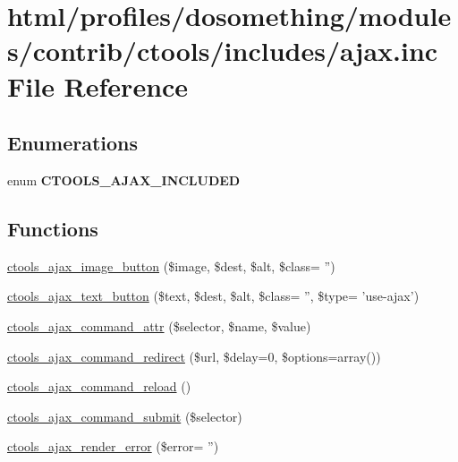 \hypertarget{profiles_2dosomething_2modules_2contrib_2ctools_2includes_2ajax_8inc}{
\section{html/profiles/dosomething/modules/contrib/ctools/includes/ajax.inc File Reference}
\label{profiles_2dosomething_2modules_2contrib_2ctools_2includes_2ajax_8inc}
}
\subsection*{Enumerations}
\begin{DoxyCompactItemize}
\item 
enum {\bfseries CTOOLS\_\-AJAX\_\-INCLUDED} 
\end{DoxyCompactItemize}
\subsection*{Functions}
\begin{DoxyCompactItemize}
\item 
\hyperlink{profiles_2dosomething_2modules_2contrib_2ctools_2includes_2ajax_8inc_a00499a965fd0a192af2106a400c0e140}{ctools\_\-ajax\_\-image\_\-button} (\$image, \$dest, \$alt, \$class= '')
\item 
\hyperlink{profiles_2dosomething_2modules_2contrib_2ctools_2includes_2ajax_8inc_aa20aff28acfb85cc21e49727d3126aad}{ctools\_\-ajax\_\-text\_\-button} (\$text, \$dest, \$alt, \$class= '', \$type= 'use-\/ajax')
\item 
\hyperlink{profiles_2dosomething_2modules_2contrib_2ctools_2includes_2ajax_8inc_a598e0895893a1295ec95964a2a7e97d8}{ctools\_\-ajax\_\-command\_\-attr} (\$selector, \$name, \$value)
\item 
\hyperlink{profiles_2dosomething_2modules_2contrib_2ctools_2includes_2ajax_8inc_a5f3e0560404a0fbd02f118c1f7408e24}{ctools\_\-ajax\_\-command\_\-redirect} (\$url, \$delay=0, \$options=array())
\item 
\hyperlink{profiles_2dosomething_2modules_2contrib_2ctools_2includes_2ajax_8inc_abadcd3021f5a0dedff23944d40dbc1ae}{ctools\_\-ajax\_\-command\_\-reload} ()
\item 
\hyperlink{profiles_2dosomething_2modules_2contrib_2ctools_2includes_2ajax_8inc_a911fe17d610b49cdf90a6d3009bab2b6}{ctools\_\-ajax\_\-command\_\-submit} (\$selector)
\item 
\hyperlink{profiles_2dosomething_2modules_2contrib_2ctools_2includes_2ajax_8inc_ab41cb38da1e7523e8697f9197cc6244e}{ctools\_\-ajax\_\-render\_\-error} (\$error= '')
\end{DoxyCompactItemize}


